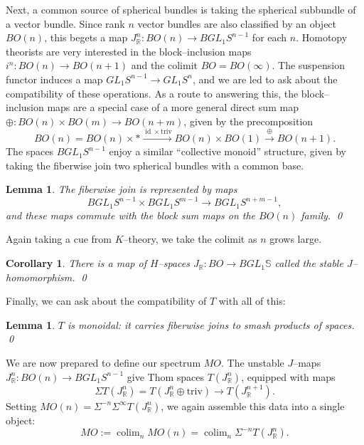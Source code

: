 \documentclass{article}
\renewcommand{\S}{\mathbb S}
\newcommand{\R}{\mathbb R}
\newcommand{\<}{\langle}
\renewcommand{\>}{\rangle}
\newcommand{\Susp}{\Sigma}
\newcommand{\GL}{\mathit{GL}}
\DeclareMathOperator{\colim}{colim}
\numberwithin{equation}{section}
\theoremstyle{plain}
\newtheorem{lemma}[equation]{Lemma}
\newtheorem{corollary}[equation]{Corollary}
\theoremstyle{definition}
\theoremstyle{remark}
\begin{document}
Next, a common source of spherical bundles is taking the spherical subbundle of a vector bundle.  Since rank $n$ vector bundles are also classified by an object $BO(n)$, this begets a map $J_{\R}^n: BO(n) \to B \GL_1 S^{n-1}$ for each $n$.  Homotopy theorists are very interested in the block--inclusion maps $i^n: BO(n) \to BO(n+1)$ and the colimit $BO = BO(\infty)$.  The suspension functor induces a map $\GL_1 S^{n-1} \to \GL_1 S^n$, and we are led to ask about the compatibility of these operations.  As a route to answering this, the block--inclusion maps are a special case of a more general direct sum map $\oplus: BO(n) \times BO(m) \to BO(n+m)$, given by the precomposition \[BO(n) = BO(n) \times * \xrightarrow{\operatorname{id} \times \text{triv}} BO(n) \times BO(1) \xrightarrow\oplus BO(n+1).\] The spaces $B \GL_1 S^{n-1}$ enjoy a similar ``collective monoid'' structure, given by taking the fiberwise join two spherical bundles with a common base.
\begin{lemma}
The fiberwise join is represented by maps \[B\GL_1 S^{n-1} \times B\GL_1 S^{m-1} \to B\GL_1 S^{n+m-1},\] and these maps commute with the block sum maps on the $BO(n)$ family. \qed
\end{lemma}
\noindent Again taking a cue from $K$--theory, we take the colimit as $n$ grows large.
\begin{corollary}
There is a map of $H$--spaces $J_{\R}: BO \to B\GL_1 \S$ called the \textit{stable $J$--homomorphism}. \qed
\end{corollary}
\noindent Finally, we can ask about the compatibility of $T$ with all of this:
\begin{lemma}
$T$ is monoidal: it carries fiberwise joins to smash products of spaces. \qed
\end{lemma}

We are now prepared to define our spectrum $MO$.  The unstable $J$--maps $J_{\R}^n: BO(n) \to B\GL_1 S^{n-1}$ give Thom spaces $T(J_{\R}^n)$, equipped with maps \[\Susp T(J_{\R}^n) = T(J_{\R}^n \oplus \text{triv}) \to T(J_{\R}^{n+1}).\] Setting $MO(n) = \Susp^{-n} \Susp^\infty T(J_{\R}^n)$, we again assemble this data into a single object: \[MO := \colim_n MO(n) = \colim_n \Susp^{-n} T(J_{\R}^n).\]
\end{document}
